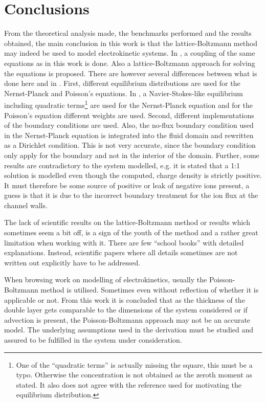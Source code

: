 \chapter{Conclusions}

From the theoretical analysis made, the benchmarks performed and the
results obtained, the main conclusion in this work is that the
lattice-Boltzmann method may indeed be used to model electrokinetic
systems. In \cite{lbm-wang}, a coupling of the same equations as in
this work is done. Also a lattice-Boltzmann approach for solving the
equations is proposed. There are however several differences between
what is done here and in \cite{lbm-wang}. First, different equilibrium
distributions are used for the Nernst-Planck and Poisson's
equations. In \cite{lbm-wang}, a Navier-Stokes-like equilibrium
including quadratic terms\footnote{One of the ``quadratic terms'' is
  actually missing the square, this must be a typo. Otherwise the
  concentration is not obtained as the zeroth moment as stated. It
  also does not agree with the reference used for motivating the
  equilibrium distribution.} are used for the Nernst-Planck equation
and for the Poisson's equation different weights are used. Second,
different implementations of the boundary conditions are used. Also,
the no-flux boundary condition used in the Nernst-Planck equation is
integrated into the fluid domain and rewritten as a Dirichlet
condition. This is not very accurate, since the boundary condition
only apply for the boundary and not in the interior of the
domain. Further, some results are contradictory to the system
modelled, e.g. it is stated that a 1:1 solution is modelled even
though the computed, charge density is strictly positive. It must
therefore be some source of positive or leak of negative ions present,
a guess is that it is due to the incorrect boundary treatment for the
ion flux at the channel walls.

The lack of scientific results on the lattice-Boltzmann method or
results which sometimes seem a bit off, is a sign of the youth of the
method and a rather great limitation when working with it. There are
few ``school books'' with detailed explanations. Instead, scientific
papers where all details sometimes are not written out explicitly
have to be addressed.

When browsing work on modelling of electrokinetics, usually the
Poisson-Boltzmann method is utilised. Sometimes even without
reflection of whether it is applicable or not. From this work it is
concluded that as the thickness of the double layer gets comparable to
the dimensions of the system considered or if advection is present,
the Poisson-Boltzmann approach may not be an accurate model. The
underlying assumptions used in the derivation must be studied and
assured to be fulfilled in the system under consideration.

